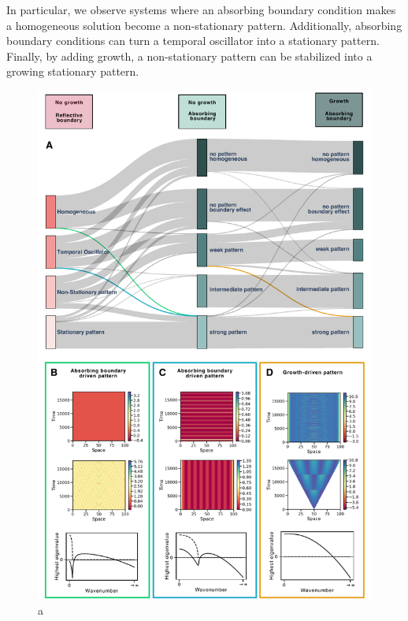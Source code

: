 In particular, we observe systems where an absorbing boundary condition makes a homogeneous solution become a non-stationary pattern.
Additionally, absorbing boundary conditions can turn a temporal oscillator into a stationary pattern.
Finally, by adding growth, a non-stationary pattern can be stabilized into a growing stationary pattern.
\begin{figure}[H]
    \includegraphics[width=1\textwidth]{figures/boundaries_growth} %
    \caption{a}
    \label{fig:boundariesgrowth} %
\end{figure}

